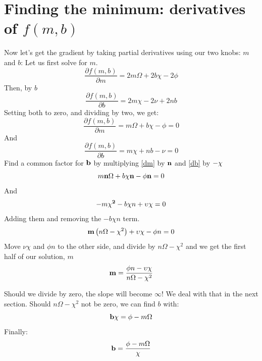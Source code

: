 \documentclass{article}
\begin{document}
\section{Finding the minimum: derivatives of  $f(m, b)$}
Now let's get the gradient by taking partial derivatives using our two knobs: $m$ and $b$:
Let us first solve for $m$.
\begin{equation}
\frac{\partial f(m,b)}{\partial m} = 2 m \Omega + 2 b \chi  - 2 \phi
\end{equation}
Then, by $b$
\begin{equation}
\frac{\partial f(m,b)}{\partial b} = 2 m \chi - 2 \nu + 2 n b
\end{equation}
Setting both to zero, and dividing by two, we get:
\begin{equation}
\label{dm}
\frac{\partial f(m,b)}{\partial m} = m \Omega + b \chi - \phi = 0
\end{equation}
And
\begin{equation}
\label{db}
\frac{\partial f(m,b)}{\partial b} =  m \chi + nb - \nu = 0
\end{equation}
Find a common factor for ${\bf b}$ by multiplying \eqref{dm} by ${\bf n}$ and \eqref{db} by ${\bf -\chi}$
\begin{equation}
m {\bf n}  \Omega +  b \chi {\bf n}  -  \phi {\bf n} = 0
\end{equation}
And
\begin{equation}
- m {\bf \chi^2}  - b {\bf \chi} n  +  \upsilon {\bf \chi} = 0
\end{equation}
Adding them and removing the $-b\chi n$ term.
\begin{equation}
{\bf m} \left( n \Omega - \chi^2 \right) + \upsilon \chi - \phi n = 0
\end{equation}
Move $\nu \chi$ and $\phi n$ to the other side, and divide by
$n \Omega - \chi^2$ and we get the first half of our solution, ${m}$
\begin{equation}
{\bf m} = \frac{\phi n - \upsilon \chi }{n \Omega - \chi^2}
\end{equation}

Should we divide by zero, the slope will become $\infty$!
We deal with that in the next section.
Should $n \Omega - \chi^2$ not be zero, we can find $b$ with:
\begin{equation}
{\bf b} \chi = \phi - m \Omega 
\end{equation}
Finally:
\begin{equation}
{\bf b} = \frac{\phi - m \Omega}{\chi}
\end{equation}
\end{document}
